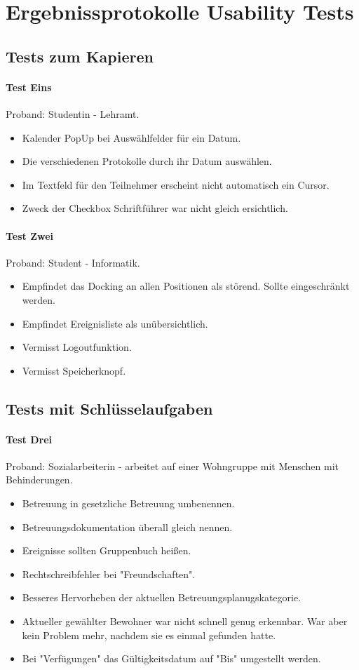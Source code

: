 \section{Ergebnissprotokolle Usability Tests}
\subsection{Tests zum Kapieren}
\paragraph*{Test Eins}
Proband: Studentin - Lehramt. 
\begin{itemize}
	\item Kalender PopUp bei Auswählfelder für ein Datum.
	\item Die verschiedenen Protokolle durch ihr Datum auswählen.
	\item Im Textfeld für den Teilnehmer erscheint nicht automatisch ein Cursor.
	\item Zweck der Checkbox Schriftführer war nicht gleich ersichtlich.

\end{itemize}

\paragraph*{Test Zwei}
Proband: Student - Informatik. 
\begin{itemize}
	\item Empfindet das Docking an allen Positionen als störend. Sollte eingeschränkt werden.
	\item Empfindet Ereignisliste als unübersichtlich.
	\item Vermisst Logoutfunktion.
	\item Vermisst Speicherknopf.
\end{itemize}

\subsection{Tests mit Schlüsselaufgaben}
\paragraph*{Test Drei}
Proband: Sozialarbeiterin - arbeitet auf einer Wohngruppe mit Menschen mit Behinderungen. 
\begin{itemize}
	\item Betreuung in gesetzliche Betreuung umbenennen. 
	\item Betreuungsdokumentation überall gleich nennen.
	\item Ereignisse sollten Gruppenbuch heißen.
	\item Rechtschreibfehler bei "Freundschaften".
	\item Besseres Hervorheben der aktuellen Betreuungsplanugskategorie.
	\item Aktueller gewählter Bewohner war nicht schnell genug erkennbar. War aber kein Problem mehr, nachdem sie es einmal gefunden hatte.
	\item Bei "Verfügungen" das Gültigkeitsdatum auf "Bis" umgestellt werden.
\end{itemize}

